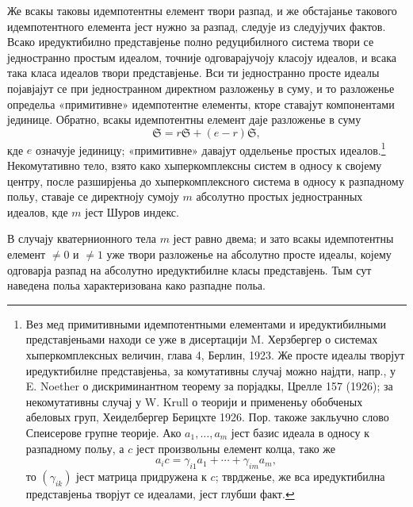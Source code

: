 ﻿\documentclass[11pt]{article}
\newcommand{\mS}{\mathfrak{S}}
\begin{document}
\noindent Же всакы таковы идемпотентны елемент твори разпад, и же обстајанье такового идемпотентного елемента јест нужно за разпад, следује из следујучих фактов. Всако иредуктибилно представјенье полно редуцибилного система твори се једностранно простым идеалом, точније одговарајучоју класоју идеалов, и всака така класа идеалов твори представјенье. Вси ти једностранно просте идеалы појавјајут се при једностранном директном разложеньу в суму, и то разложенье определьа «примитивне» идемпотентне елементы, кторе ставајут компонентами јединице. Обратно, всакы идемпотентны елемент даје разложенье в суму
\[
        \mS=r\mS+(e-r)\mS,
\]
кде $e$ означује јединицу; «примитивне» давајут оддельенье простых идеалов.\footnote{Вез мед примитивными идемпотентными елементами и иредуктибилными представјеньами находи се уже в дисертацији M. Херзбергер о системах хыперкомплексных величин, глава 4, Берлин, 1923. Же просте идеалы творјут иредуктибилне представјеньа, за комутативны случај можно најдти, напр., у E. Noether о дискриминантном теорему за порјадкы, Црелле 157 (1926); за некомутативны случај у W. Krull о теорији и примененьу обобченых абеловых груп, Хеиделбергер Берицхте 1926. Пор. такоже закльучно слово Спеисерове групне теорије. Ако $a_1,\ldots,a_m$ јест базис идеала в односу к разпадному польу, а $c$ јест произвольны елемент колца, тако же
\[
        a_i c=\gamma_{i1}a_1+\cdots+\gamma_{im}a_m,
\]
то $(\gamma_{ik})$ јест матрица придружена к $c$; тврдженье, же вса иредуктибилна представјеньа творјут се идеалами, јест глубши факт.} Некомутативно тело, взято како хыперкомплексны систем в односу к својему центру, после разширјеньа до хыперкомплексного система в односу к разпадному польу, ставаје се директноју сумоју $m$ абсолутно простых једностранных идеалов, кде $m$ јест Шуров индекс.

\medskip

\noindent В случају кватернионного тела $m$ јест равно двема; и зато всакы идемпотентны елемент $\ne0$ и $\ne1$ уже твори разложенье на абсолутно просте идеалы, којему одговарја разпад на абсолутно иредуктибилне класы представјень. Тым сут наведена польа характеризована како разпадне польа.
\end{document}
